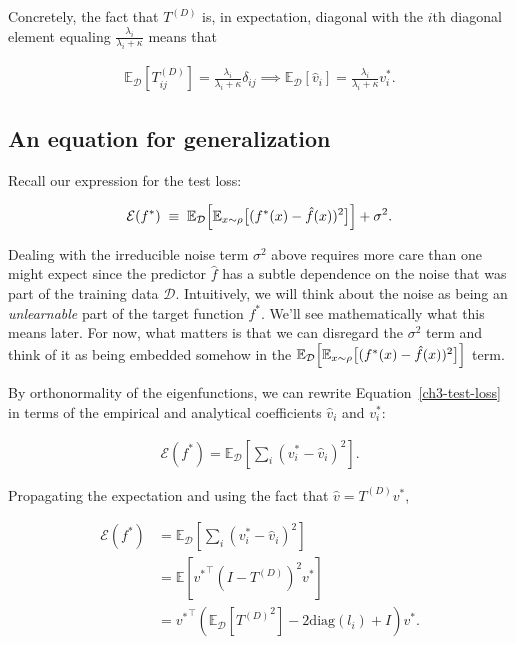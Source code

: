 Concretely, the fact that $T^{(D)}$ is, in expectation, diagonal with the $i$th diagonal element equaling $\frac{\lambda_i}{\lambda_i+\kappa}$ means that 

\begin{align}
\label{ch3-vhat}
\mathbb{E}_{\mathcal{D}} [T^{(D)}_{ij}] = \frac{\lambda_i}{\lambda_i+\kappa}\delta_{ij}\implies \mathbb{E}_{\mathcal{D}} [\hat{v}_i] = \frac{\lambda_i}{\lambda_i+\kappa} v^*_i.
\end{align}

\subsection{An equation for generalization}

Recall our expression for the test loss:

\begin{align}
\label{ch3-test-loss}
\mathcal{E}(f^*) \;\equiv\; \mathbb{E}_{\mathcal{D}}\Big[\mathbb{E}_{x\sim \rho}\big[(f^*(x)-\hat f(x))^2\big]\Big] + \sigma^2.
\end{align}

Dealing with the irreducible noise term $\sigma^2$ above requires more care than one might expect since the predictor $\hat{f}$ has a subtle dependence on the noise that was part of the training data $\mathcal{D}$. Intuitively, we will think about the noise as being an \textit{unlearnable} part of the target function $f^*$. We'll see mathematically what this means later. For now, what matters is that we can disregard the $\sigma^2$ term and think of it as being embedded somehow in the $\mathbb{E}_{\mathcal{D}}\Big[\mathbb{E}_{x\sim \rho}\big[(f^*(x)-\hat f(x))^2\big]\Big]$ term.

By orthonormality of the eigenfunctions, we can rewrite Equation~\eqref{ch3-test-loss} in terms of the empirical and analytical coefficients $\hat{v}_i$ and $v^*_i$:

\begin{align}
\mathcal{E}(f^*) = \mathbb{E}_{\mathcal{D}}\left[\sum_i (v^*_i-\hat{v}_i)^2 \right].
\end{align}

Propagating the expectation and using the fact that $\hat{v}=T^{(D)}v^*$,

\begin{align}
    \mathcal{E}(f^*) &= \mathbb{E}_{\mathcal{D}}\left[\sum_i (v^*_i-\hat{v}_i)^2\right] \\
    &= \mathbb{E} \left[{v^*}^{\top}(I-T^{(D)})^2v^* \right] \\
    &= {v^*}^{\top}\left(\mathbb{E}_{\mathcal{D}}\left[{T^{(D)}}^2\right]-2\text{diag}(l_i)+I\right)v^*.
\end{align}

